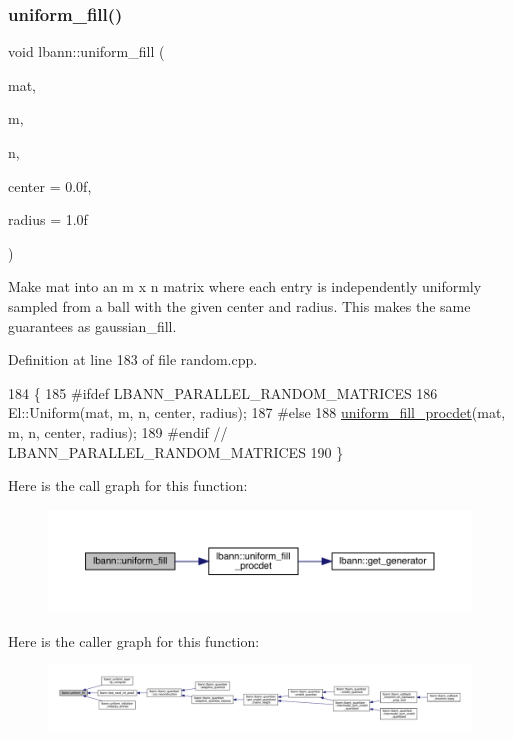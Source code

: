 \subsubsection{\texorpdfstring{uniform\+\_\+fill()}{uniform\_fill()}}
{\footnotesize\ttfamily void lbann\+::uniform\+\_\+fill (\begin{DoxyParamCaption}\item[{\hyperlink{base_8hpp_a9a697a504ae84010e7439ffec862b470}{Abs\+Dist\+Mat} \&}]{mat,  }\item[{El\+::\+Int}]{m,  }\item[{El\+::\+Int}]{n,  }\item[{Data\+Type}]{center = {\ttfamily 0.0f},  }\item[{Data\+Type}]{radius = {\ttfamily 1.0f} }\end{DoxyParamCaption})}

Make mat into an m x n matrix where each entry is independently uniformly sampled from a ball with the given center and radius. This makes the same guarantees as gaussian\+\_\+fill. 

Definition at line 183 of file random.\+cpp.


\begin{DoxyCode}
184                                    \{
185 \textcolor{preprocessor}{#ifdef LBANN\_PARALLEL\_RANDOM\_MATRICES}
186   El::Uniform(mat, m, n, center, radius);
187 \textcolor{preprocessor}{#else}
188   \hyperlink{namespacelbann_a93fc1b42be6ab461e803cb48d58c4d81}{uniform\_fill\_procdet}(mat, m, n, center, radius);
189 \textcolor{preprocessor}{#endif  // LBANN\_PARALLEL\_RANDOM\_MATRICES}
190 \}
\end{DoxyCode}
Here is the call graph for this function\+:\nopagebreak
\begin{figure}[H]
\begin{center}
\leavevmode
\includegraphics[width=350pt]{namespacelbann_a7336c565aa23c1dab784530c581db3d1_cgraph}
\end{center}
\end{figure}
Here is the caller graph for this function\+:\nopagebreak
\begin{figure}[H]
\begin{center}
\leavevmode
\includegraphics[width=350pt]{namespacelbann_a7336c565aa23c1dab784530c581db3d1_icgraph}
\end{center}
\end{figure}
\mbox{\label{namespacelbann_a93fc1b42be6ab461e803cb48d58c4d81}} 
